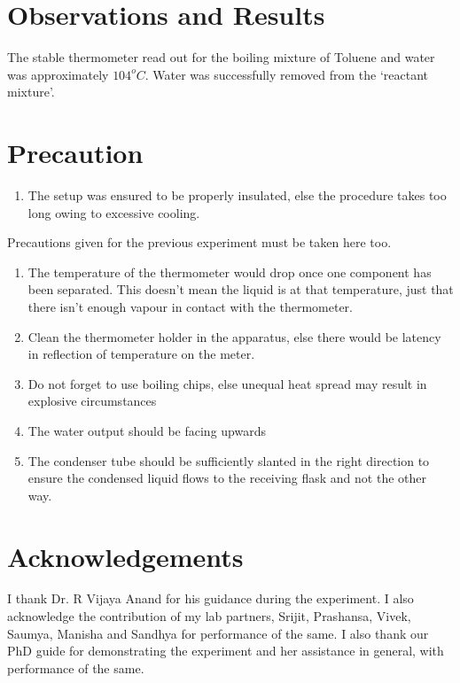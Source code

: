 \section{Observations and Results}
	The stable thermometer read out for the boiling mixture of Toluene and water was approximately $104 ^o C$. Water was successfully removed from the `reactant mixture'. 

\section{Precaution}
	\begin{enumerate}
		\item The setup was ensured to be properly insulated, else the procedure takes too long owing to excessive cooling.
	\end{enumerate}
	Precautions given for the previous experiment must be taken here too.
	\begin{enumerate}
		\item The temperature of the thermometer would drop once one component has been separated. This doesn't mean the liquid is at that temperature, just that there isn't enough vapour in contact with the thermometer.
		\item Clean the thermometer holder in the apparatus, else there would be latency in reflection of temperature on the meter.	
		\item Do not forget to use boiling chips, else unequal heat spread may result in explosive circumstances
		\item The water output should be facing upwards
		\item The condenser tube should be sufficiently slanted in the right direction to ensure the condensed liquid flows to the receiving flask and not the other way.
	\end{enumerate}

	
\section{Acknowledgements}
I thank Dr. R Vijaya Anand for his guidance during the experiment. I also acknowledge the contribution of my lab partners, Srijit, Prashansa, Vivek, Saumya, Manisha and Sandhya for performance of the same. I also thank our PhD guide for demonstrating the experiment and her assistance in general, with performance of the same.


